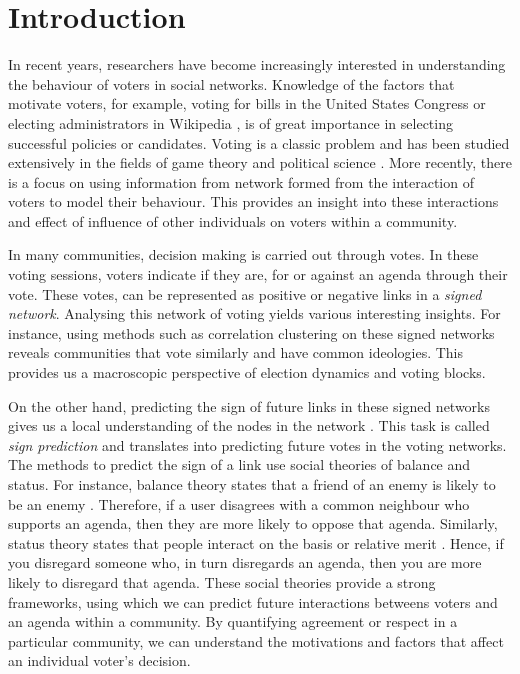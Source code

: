 \chapter{Introduction}



In recent years, researchers have become increasingly interested in understanding the behaviour of voters in social networks. Knowledge of the factors that motivate voters, for example, voting for bills in the United States Congress \cite{karimi2019multicongress} or electing administrators in Wikipedia \cite{jankowski-lorek2013MBSN,cabunducan2011voting,lee2012uncovering}, is of great importance in selecting successful policies or candidates. Voting is a classic problem and has been studied extensively in the fields of game theory and political science \cite{zou2015strategicDoodle,kearns2009behavioral,tal2015a}. More recently, there is a focus on using information from network formed from the interaction of voters to model their behaviour. This provides an insight into these interactions and effect of influence of other individuals on voters within a community.

In many communities, decision making is carried out through votes.
In these voting sessions, voters indicate if they are, for or against an agenda through their vote.
These votes, can be represented as positive or negative links in a \textit{signed network}.
Analysing this network of voting yields various interesting insights.
For instance, using methods such as correlation clustering \cite{brito2020aBrazil,levorato2016brazilian,chiang2014prediction} on these signed networks reveals communities that vote similarly and have common ideologies. 
This provides us a macroscopic perspective of election dynamics and voting blocks.

On the other hand, predicting the sign of future links in these signed networks gives us a local understanding of the nodes in the network \cite{leskovec2010predicting,leskovec2010signed,chiang2011exploiting}.
This task is called \textit{sign prediction} and translates into predicting future votes in the voting networks.
The methods to predict the sign of a link use social theories of balance and status.
For instance, balance theory states that a friend of an enemy is likely to be an enemy \cite{harary1953on}.
Therefore, if a user disagrees with a common neighbour who supports an agenda, then they are more likely to oppose that agenda. 
Similarly, status theory states that people interact on the basis or relative merit \cite{leskovec2010predicting}.
Hence, if you disregard someone who, in turn disregards an agenda, then you are more likely to disregard that agenda.
These social theories provide a strong frameworks, using which we can predict future interactions betweens voters and an agenda within a community.
By quantifying agreement or respect in a particular community, we can understand the motivations and factors that affect an individual voter's decision.

